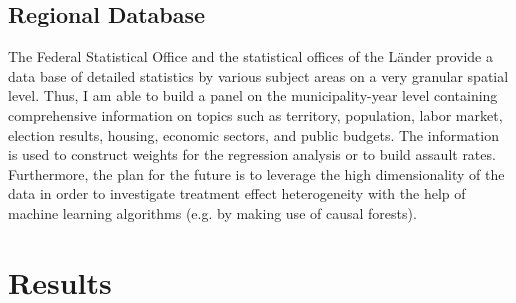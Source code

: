 \documentclass[11pt, a4paper, draft]{article} %
\begin{document}
\subsection{Regional Database}
The Federal Statistical Office and the statistical offices of the Länder provide a data base of detailed statistics by various subject areas on a very granular spatial level. Thus, I am able to build a panel on the municipality-year level containing comprehensive information on topics such as territory, population, labor market, election results, housing, economic sectors, and public budgets. The information is used to construct weights for the regression analysis or to build assault rates. Furthermore, the plan for the future is to leverage the high dimensionality of the data in order to investigate treatment effect heterogeneity with the help of machine learning algorithms (e.g. by making use of causal forests). 














\newpage
\section{Results}\label{sec_soc_ext:results}
\end{document}
